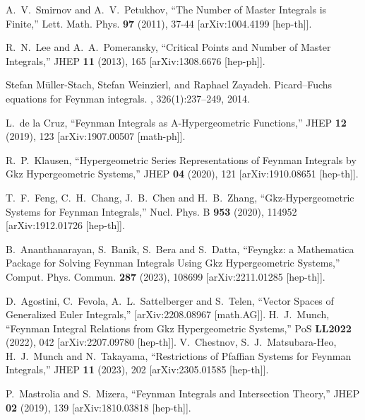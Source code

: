 \documentclass[a4paper,12pt]{article}
\numberwithin{equation}{section}
\numberwithin{figure}{section}
\begin{document}
\begin{thebibliography}{99}
A.~V.~Smirnov and A.~V.~Petukhov,
``The Number of Master Integrals is Finite,''
Lett. Math. Phys. \textbf{97} (2011), 37-44
[arXiv:1004.4199 [hep-th]].



R.~N.~Lee and A.~A.~Pomeransky,
``Critical Points and Number of Master Integrals,''
JHEP \textbf{11} (2013), 165
[arXiv:1308.6676 [hep-ph]].



Stefan M{\"u}ller-Stach, Stefan Weinzierl, and Raphael Zayadeh.
\newblock Picard--{F}uchs equations for {F}eynman integrals.
,
326(1):237--249, 2014.
\newblock [arXiv:1212.4389]
  
L.~de la Cruz,
``Feynman Integrals as A-Hypergeometric Functions,''
JHEP \textbf{12} (2019), 123
[arXiv:1907.00507 [math-ph]].

R.~P.~Klausen,
``Hypergeometric Series Representations of Feynman Integrals by Gkz Hypergeometric Systems,''
JHEP \textbf{04} (2020), 121
[arXiv:1910.08651 [hep-th]].
  
T.~F.~Feng, C.~H.~Chang, J.~B.~Chen and H.~B.~Zhang,
``Gkz-Hypergeometric Systems for Feynman Integrals,''
Nucl. Phys. B \textbf{953} (2020), 114952
[arXiv:1912.01726 [hep-th]].

B.~Ananthanarayan, S.~Banik, S.~Bera and S.~Datta,
``Feyngkz: a Mathematica Package for Solving Feynman Integrals Using Gkz Hypergeometric Systems,''
Comput. Phys. Commun. \textbf{287} (2023), 108699
[arXiv:2211.01285 [hep-th]].

D.~Agostini, C.~Fevola, A.~L.~Sattelberger and S.~Telen,
``Vector Spaces of Generalized Euler Integrals,''
[arXiv:2208.08967 [math.AG]].
H.~J.~Munch,
``Feynman Integral Relations from Gkz Hypergeometric Systems,''
PoS \textbf{LL2022} (2022), 042
[arXiv:2207.09780 [hep-th]].
V.~Chestnov, S.~J.~Matsubara-Heo, H.~J.~Munch and N.~Takayama,
``Restrictions of Pfaffian Systems for Feynman Integrals,''
JHEP \textbf{11} (2023), 202
[arXiv:2305.01585 [hep-th]].

P.~Mastrolia and S.~Mizera,
``Feynman Integrals and Intersection Theory,''
JHEP \textbf{02} (2019), 139
[arXiv:1810.03818 [hep-th]].


\end{thebibliography}
\end{document}
